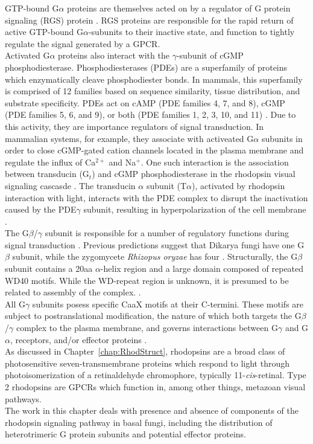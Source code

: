 \indent GTP-bound G$\alpha$ proteins are themselves acted on by a regulator of G protein signaling (RGS) protein \cite{DeVries2000}. RGS proteins are responsible for the rapid return of active GTP-bound G$\alpha$-subunits to their inactive state, and function to tightly regulate the signal generated by a GPCR. \\
\indent Activated G$\alpha$ proteins also interact with the $\gamma$-subunit of cGMP phosphodiesterase. Phosphodiesterases (PDEs) are a superfamily of proteins which enzymatically cleave phosphodiester bonds. In mammals, this superfamily is comprised of 12 families based on sequence similarity, tissue distribution, and substrate specificity. PDEs act on cAMP (PDE families 4, 7, and 8), cGMP (PDE families 5, 6, and 9), or both (PDE families 1, 2, 3, 10, and 11) \cite{Conti2000}. Due to this activity, they are importance regulators of signal transduction. In mammalian systems, for example, they associate with activeated G$\alpha$ subunits in order to close cGMP-gated cation channels located in the plasma membrane and regulate the influx of Ca$^{2+}$ and Na$^{+}$. One such interaction is the association between transducin (G$_{t}$) and cGMP phosphodiesterase in the rhodopsin visual signaling cascasde \cite{Deterre1988}. The transducin $\alpha$ subunit (T$\alpha$), activated by rhodopsin interaction with light, interacts with the PDE complex to disrupt the inactivation caused by the PDE$\gamma$ subunit, resulting in hyperpolarization of the cell membrane \cite{Deterre1988}.\\
\indent The G$\beta$/$\gamma$ subunit is responsible for a number of regulatory functions during signal transduction \cite{Clapham1997}. Previous predictions suggest that Dikarya fungi have one G$\beta$ subunit, while the zygomycete \textit{Rhizopus oryzae} has four \cite{Li2007}. Structurally, the G$\beta$ subunit contains a 20aa $\alpha$-helix region and a large domain composed of repeated WD40 motifs. While the WD-repeat region is unknown, it is presumed to be related to assembly of the complex. \cite{Clapham1997}.\\
\indent All G$\gamma$ subunits posess specific CaaX motifs at their C-termini. These motifs are subject to 
postranslational modification, the nature of which both targets the G$\beta$/$\gamma$ complex to 
the plasma membrane, and governs interactions between G$\gamma$ and G$\alpha$, receptors, and/or 
effector proteins \cite{Krystofova2005}.\\
\indent As discussed in Chapter~\ref{chap:RhodStruct}, rhodopsins are a broad class of photosensitive 
seven-transmembrane proteins which respond to light through photoisomerization of a retinaldehyde chromophore, 
typically 11-\textit{cis}-retinal. Type 2 rhodopsins are GPCRs which function in, among other things, metazoan visual pathways.\\
\indent The work in this chapter deals with presence and absence of components of the 
rhodopsin signaling pathway in basal fungi, including the distribution of heterotrimeric 
G protein subunits and potential effector proteins.\\

